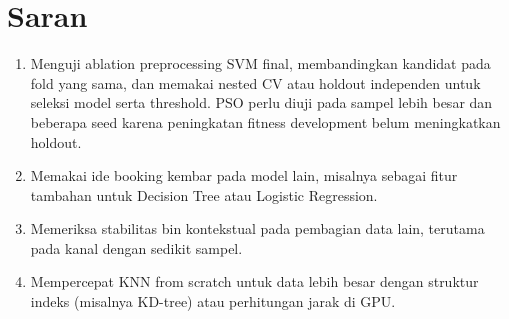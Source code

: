 \section{Saran}
\begin{enumerate}
  \item Menguji ablation preprocessing SVM final, membandingkan kandidat pada fold yang sama, dan memakai nested CV atau holdout independen untuk seleksi model serta threshold. PSO perlu diuji pada sampel lebih besar dan beberapa seed karena peningkatan fitness development belum meningkatkan holdout.
  \item Memakai ide booking kembar pada model lain, misalnya sebagai fitur tambahan untuk Decision Tree atau Logistic Regression.
  \item Memeriksa stabilitas bin kontekstual pada pembagian data lain, terutama pada kanal dengan sedikit sampel.
  \item Mempercepat KNN from scratch untuk data lebih besar dengan struktur indeks (misalnya KD-tree) atau perhitungan jarak di GPU.
\end{enumerate}
